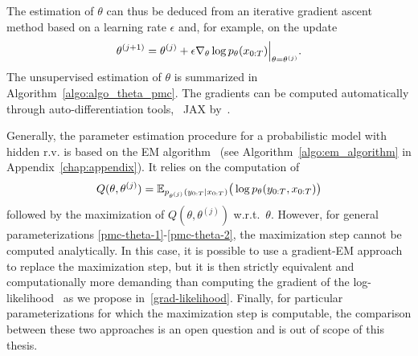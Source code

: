 The estimation of $\theta$ can thus be deduced
from an iterative gradient ascent method based on a learning
rate $\epsilon$ and, for example, on the update
\begin{equation}
\label{grad-likelihood}
\theta^{(j+1)}=\theta^{(j)} + \epsilon {\nabla_{\theta} \log{p_{\theta}(x_{0:T})}}\Big|_{\theta=\theta^{(j)}} \text{.}
\end{equation}
The unsupervised estimation of $\theta$ is summarized in Algorithm~\ref{algo:algo_theta_pmc}.
The gradients can be computed automatically through auto-differentiation tools,
\eg~JAX by~\cite{jax2018github}.



\begin{remark}
\label{rem-EM}
Generally, the parameter estimation
procedure for a probabilistic model with hidden r.v. is based on the 
EM algorithm~\citep{dempster1977maximum} 
(see Algorithm~\ref{algo:em_algorithm}
 in Appendix~\ref{chap:appendix}).
It relies on the computation of 
$$Q(\theta,\theta^{(j)})={\mathbb{E}}_{p_{\theta^{(j)}}(y_{0:T}|x_{0:T})}\big(\log p_{\theta}(y_{0:T},x_{0:T}) \big)$$ 
followed by the maximization of $Q(\theta,\theta^{(j)})$ w.r.t.~$\theta$.
However, for general parameterizations \eqref{pmc-theta-1}-\eqref{pmc-theta-2},
the maximization step cannot be computed analytically. In this case, it is
possible to use a gradient-EM approach to replace the maximization step, but it
is then strictly equivalent and computationally more demanding than computing
the gradient of the log-likelihood~\citep{xu1996convergence,
balakrishnan2017statistical} as we propose in~\eqref{grad-likelihood}. Finally,
for particular parameterizations for which the maximization step is computable,
the comparison between these two approaches is an open question and is out of
scope of this thesis.
\end{remark}


